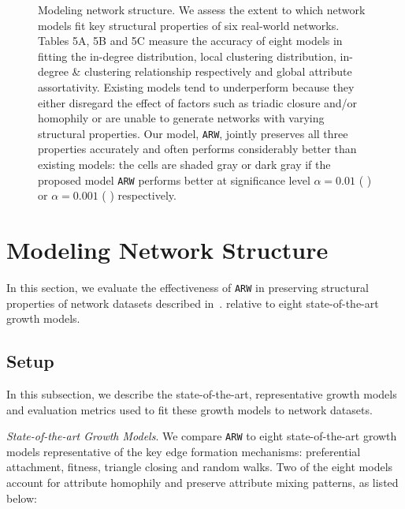 
\begin{figure*}[t]
	\vspace{-15pt}
	\centering
	\vspace{-16pt}
	\caption{
		Modeling network structure. We assess the extent to which network models
		fit key structural properties of six real-world networks. Tables 5A, 5B and 5C
		measure the accuracy of eight models in fitting the in-degree distribution,
		local clustering distribution, in-degree \& clustering relationship
		respectively and global attribute assortativity.
		Existing models tend to underperform because they either disregard
		the effect of factors such as triadic closure and/or homophily
		or are unable to generate networks with varying structural properties.
		Our model, \texttt{ARW}, jointly preserves all three properties accurately and often
		performs considerably better than existing models:
		the cells are shaded gray or dark gray if the proposed model \texttt{ARW} performs
		better at significance level $\alpha=0.01$ ( \lightgraybg{ }) or $\alpha=0.001$ ( \darkgraybg{ })
		respectively.
	}
	\vspace{-10pt}
	\label{fig:exp_table}
\end{figure*}

\section{Modeling Network Structure}
\label{sec:Experiments}
In this section, we evaluate the effectiveness of \texttt{ARW} in preserving
structural properties of network datasets described in~.
relative to eight state-of-the-art growth models.

\subsection{Setup}
\label{sub:Experimental Setup}

In this subsection, we describe the state-of-the-art, representative growth models
and evaluation metrics used to fit these growth models to network datasets.

\textit{State-of-the-art Growth Models}. We compare \texttt{ARW} to eight state-of-the-art
growth models representative of the key edge formation
mechanisms: preferential attachment, fitness, triangle closing and random walks.
Two of the eight models account for attribute homophily and preserve attribute mixing patterns,
as listed below:

